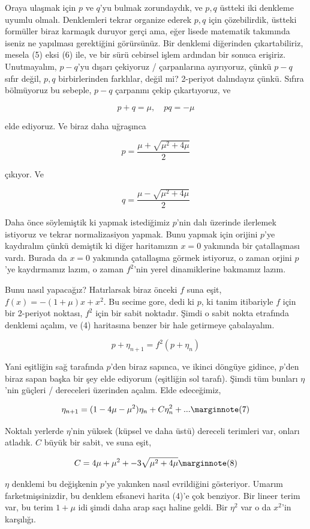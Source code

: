 \documentclass[12pt,fleqn]{article}\usepackage{../../common}
\begin{document}
Oraya ulaşmak için $p$ ve $q$'yu bulmak zorundaydık, ve $p,q$ üstteki iki
denkleme uyumlu olmalı. Denklemleri tekrar organize ederek $p,q$ için
çözebilirdik, üstteki formüller biraz karmaşık duruyor gerçi ama, eğer
lisede matematik takımında iseniz ne yapılması gerektiğini görürsünüz. Bir
denklemi diğerinden çıkartabiliriz, mesela (5) eksi (6) ile, ve bir sürü
cebirsel işlem ardından bir sonuca erişiriz. Unutmayalım, $p-q$'yu dışarı
çekiyoruz / çarpanlarına ayırıyoruz, çünkü $p-q$ sıfır değil, $p,q$
birbirlerinden farklılar, değil mi? 2-periyot dalındayız çünkü. Sıfıra
bölmüyoruz bu sebeple, $p-q$ çarpanını çekip çıkartıyoruz, ve

$$ p + q = \mu, \quad pq = -\mu $$

elde ediyoruz. Ve biraz daha uğraşınca

$$ p = \frac{\mu + \sqrt{\mu^2 + 4\mu}}{2}$$

çıkıyor. Ve

$$ q = \frac{\mu - \sqrt{\mu^2 + 4\mu}}{2}$$

Daha önce söylemiştik ki yapmak istediğimiz $p$'nin dalı üzerinde ilerlemek
istiyoruz ve tekrar normalizasiyon yapmak. Bunu yapmak için orijini $p$'ye
kaydıralım çünkü demiştik ki diğer haritamızın $x=0$ yakınında bir çatallaşması
vardı. Burada da $x=0$ yakınında çatallaşma görmek istiyoruz, o zaman orjini
$p$'ye kaydırmamız lazım, o zaman $f^2$'nin yerel dinamiklerine bakmamız lazım. 

Bunu nasıl yapacağız? Hatırlarsak biraz önceki $f$ suna eşit, $f(x) =
-(1+\mu)x+x^2$. Bu secime gore, dedi ki $p$, ki tanim itibariyle $f$ için bir
2-periyot noktası, $f^2$ için bir sabit noktadır. Şimdi o sabit nokta etrafında
denklemi açalım, ve (4) haritasına benzer bir hale getirmeye çabalayalım.

$$ p + \eta_{n+1} = f^2(p+\eta_n) $$

Yani eşitliğin sağ tarafında $p$'den biraz sapınca, ve ikinci döngüye gidince,
$p$'den biraz sapan başka bir şey elde ediyorum (eşitliğin sol tarafı). Şimdi
tüm bunları $\eta$'nin güçleri / dereceleri üzerinden açalım. Elde edeceğimiz,

$$ \eta_{n+1} = (1-4\mu-\mu^2)\eta_n + C \eta_n^2 + ... 
\mlabel{7}$$

Noktalı yerlerde $\eta$'nin yüksek (küpsel ve daha üstü) dereceli terimleri
var, onları atladık. $C$ büyük bir sabit, ve suna eşit,

$$ C = 4\mu + \mu^2 + -3\sqrt{\mu^2+4\mu} 
\mlabel{8}$$

$\eta$ denklemi bu değişkenin $p$'ye yakınken nasıl evrildiğini
gösteriyor. Umarım farketmişsinizdir, bu denklem efsanevi harita (4)'e çok
benziyor. Bir lineer terim var, bu terim $1+\mu$ idi şimdi daha arap saçı haline
geldi. Bir $\eta^2$ var o da $x^2$'in karşılığı.
\end{document}
